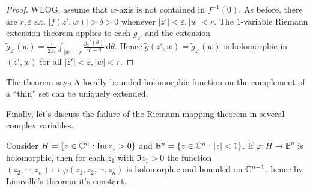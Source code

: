 \begin{proof}
  WLOG, assume that $w$-axis is not contained in  $f^{-1}(0)$. As before, there are $r,\varepsilon $ s.t. $|f(z',w)|>\delta>0$ whenever $|z'|<\varepsilon ,|w|<r$. The $1$-variable Riemann extension theorem applies to each $g_{z'}$ and the extension $\widetilde{g}_{z'}(w)=\frac{1}{2\pi i}\int_{|w|=r}\frac{g_z'(\theta)}{w-\theta}\,\mathrm{d}\theta$. Hence $\widetilde{g}(z',w)=\widetilde{g}_{z'}(w)$ is holomorphic in $(z',w)$ for all $|z'|<\varepsilon ,|w|<r$. 
\end{proof}

 The theorem says A locally bounded holomorphic function on the complement of a ``thin'' set can be uniquely extended.

 Finally, let's discuss the failure of the Riemann mapping theorem in several complex variables.
\begin{example}
  Consider $H=\left\{z\in \mathbb{C}^{n}: \operatorname{Im} z_1> 0\right\} $ and $\mathbb{B}^{n}=\left\{z\in \mathbb{C}^{n}:|z|<1\right\} $. If $\varphi :H\to \mathbb{B}^{n}$ is holomorphic, then for each $z_1$ with $\Im z_1>0$ the function $(z_2,\cdots ,z_n)\mapsto \varphi(z_1,z_2,\cdots ,z_n)$ is holomorphic and bounded on $\mathbb{C}^{n-1}$, hence by Liouville's theorem it's constant.
\end{example}

